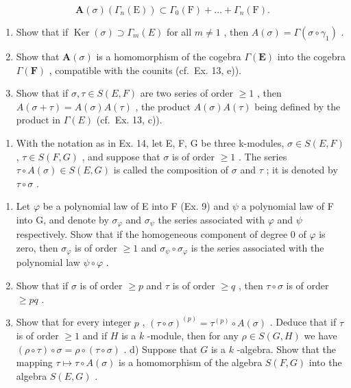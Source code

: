 \[
\mathbf {A} (\sigma) \left(\Gamma_ {n} (\mathrm{E})\right) \subset \Gamma_ {0} (\mathrm{F}) + \dots + \Gamma_ {n} (\mathrm{F}).
\]

\begin{enumerate}
\def\labelenumi{\alph{enumi})}
\setcounter{enumi}{1}
\item
  Show that if \(\operatorname{Ker}(\sigma) \supset \Gamma_m(E)\) for all \(m \neq 1\) , then \(A(\sigma) = \Gamma(\sigma \circ \gamma_1)\) .
\item
  Show that \(\mathbf{A}(\sigma)\) is a homomorphism of the cogebra \(\Gamma(\mathbf{E})\) into the cogebra \(\Gamma(\mathbf{F})\) , compatible with the counits (cf.~Ex. 13, e)).
\item
  Show that if \(\sigma, \tau \in S(E, F)\) are two series of order \(\geqslant 1\) , then \(A(\sigma + \tau) = A(\sigma)A(\tau)\) , the product \(A(\sigma)A(\tau)\) being defined by the product in \(\Gamma(E)\) (cf.~Ex. 13, c)).
\end{enumerate}

\begin{enumerate}
\def\labelenumi{\arabic{enumi})}
\setcounter{enumi}{14}
\tightlist
\item
  With the notation as in Ex. 14, let E, F, G be three k-modules, \(\sigma \in S(E, F)\) , \(\tau \in S(F, G)\) , and suppose that \(\sigma\) is of order \(\geqslant 1\) . The series \(\tau \circ A(\sigma) \in S(E, G)\) is called the composition of \(\sigma\) and \(\tau\) ; it is denoted by \(\tau \circ \sigma\) .
\end{enumerate}

\begin{enumerate}
\def\labelenumi{\alph{enumi})}
\item
  Let \(\varphi\) be a polynomial law of E into F (Ex. 9) and \(\psi\) a polynomial law of F into G, and denote by \(\sigma_{\varphi}\) and \(\sigma_{\psi}\) the series associated with \(\varphi\) and \(\psi\) respectively. Show that if the homogeneous component of degree 0 of \(\varphi\) is zero, then \(\sigma_{\varphi}\) is of order \(\geqslant 1\) and \(\sigma_{\psi} \circ \sigma_{\varphi}\) is the series associated with the polynomial law \(\psi \circ \varphi\) .
\item
  Show that if \(\sigma\) is of order \(\geqslant p\) and \(\tau\) is of order \(\geqslant q\) , then \(\tau \circ \sigma\) is of order \(\geqslant pq\) .
\item
  Show that for every integer \(p\) , \((\tau \circ \sigma)^{(p)} = \tau^{(p)} \circ A(\sigma)\) . Deduce that if \(\tau\) is of order \(\geqslant 1\) and if \(H\) is a \(k\) -module, then for any \(\rho \in S(G, H)\) we have \((\rho \circ \tau) \circ \sigma = \rho \circ (\tau \circ \sigma)\) . d) Suppose that \(G\) is a \(k\) -algebra. Show that the mapping \(\tau \mapsto \tau \circ A(\sigma)\) is a homomorphism of the algebra \(S(F, G)\) into the algebra \(S(E, G)\) .
\end{enumerate}

